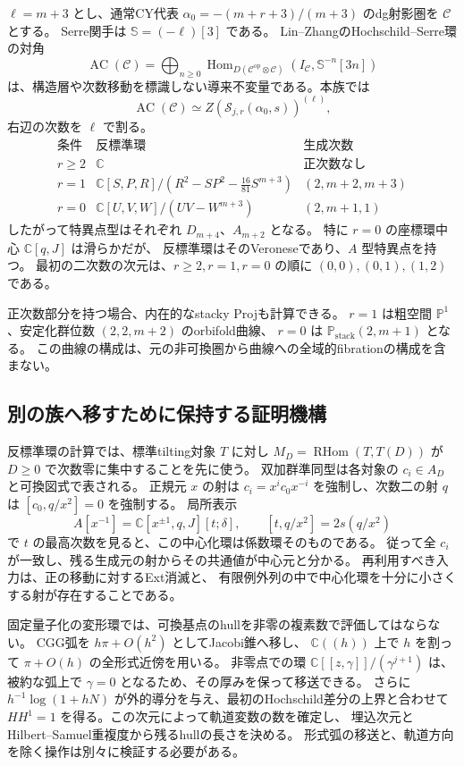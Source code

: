 $\ell=m+3$ とし、通常CY代表
$\alpha_0=-(m+r+3)/(m+3)$ のdg射影圏を $\mathcal C$ とする。
Serre関手は $\mathbb S=(-\ell)[3]$ である。
Lin--ZhangのHochschild--Serre環\cite{LinZhangSerre2025}の対角
\[
 \operatorname{AC}(\mathcal C)
 =\bigoplus_{n\ge0}
 \operatorname{Hom}_{D(\mathcal C^{\mathrm{op}}\otimes\mathcal C)}
 (I_{\mathcal C},\mathbb S^{-n}[3n])
\]
は、構造層や次数移動を標識しない導来不変量である。本族では
\[
 \operatorname{AC}(\mathcal C)\simeq Z(\mathcal S_{j,r}(\alpha_0,s))^{(\ell)},
\]
右辺の次数を $\ell$ で割る。
\[
\begin{array}{c|c|c}
 \text{条件}&\text{反標準環}&\text{生成次数}\\\hline
 r\ge2&\mathbb C&\text{正次数なし}\\[1mm]
 r=1&\mathbb C[S,P,R]/(R^2-SP^2-\frac{16}{81}S^{m+3})
 &(2,m+2,m+3)\\[1mm]
 r=0&\mathbb C[U,V,W]/(UV-W^{m+3})&(2,m+1,1)
\end{array}
\]
したがって特異点型はそれぞれ $D_{m+4}$、$A_{m+2}$ となる。
特に $r=0$ の座標環中心 $\mathbb C[q,J]$ は滑らかだが、
反標準環はそのVeroneseであり、$A$ 型特異点を持つ。
最初の二次数の次元は、$r\ge2,r=1,r=0$ の順に
$(0,0),(0,1),(1,2)$ である。

正次数部分を持つ場合、内在的なstacky Projも計算できる。
$r=1$ は粗空間 $\mathbb P^1$、安定化群位数 $(2,2,m+2)$ のorbifold曲線、
$r=0$ は $\mathbb P_{\mathrm{stack}}(2,m+1)$ となる。
この曲線の構成は、元の非可換圏から曲線への全域的fibrationの構成を含まない。

\subsection{別の族へ移すために保持する証明機構}

反標準環の計算では、標準tilting対象 $T$ に対し
$M_D=\operatorname{RHom}(T,T(D))$ が $D\ge0$ で次数零に集中することを先に使う。
双加群準同型は各対象の $c_i\in A_D$ と可換図式で表される。
正規元 $x$ の射は $c_i=x^ic_0x^{-i}$ を強制し、次数二の射 $q$ は
$[c_0,q/x^2]=0$ を強制する。
局所表示
\[
 A[x^{-1}]=\mathbb C[x^{\pm1},q,J][t;\delta],\qquad
 [t,q/x^2]=2s(q/x^2)
\]
で $t$ の最高次数を見ると、この中心化環は係数環そのものである。
従って全 $c_i$ が一致し、残る生成元の射からその共通値が中心元と分かる。
再利用すべき入力は、正の移動に対するExt消滅と、
有限例外列の中で中心化環を十分に小さくする射が存在することである。

固定量子化の変形環では、可換基点のhullを非零の複素数で評価してはならない。
CGG弧を $h\pi+O(h^2)$ としてJacobi錐へ移し、
$\mathbb C((h))$ 上で $h$ を割って $\pi+O(h)$ の全形式近傍を用いる。
非零点での環 $\mathbb C[[z,\gamma]]/(\gamma^{j+1})$ は、
被約な弧上で $\gamma=0$ となるため、その厚みを保って移送できる。
さらに $h^{-1}\log(1+hN)$ が外的導分を与え、最初のHochschild差分の上界と合わせて
$HH^1=1$ を得る。この次元によって軌道変数の数を確定し、
埋込次元とHilbert--Samuel重複度から残るhullの長さを決める。
形式弧の移送と、軌道方向を除く操作は別々に検証する必要がある。

